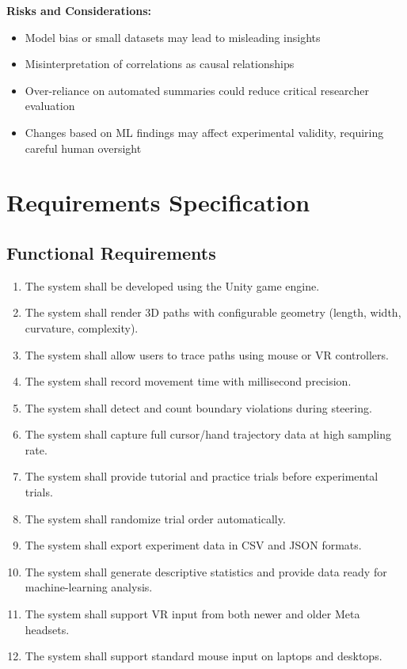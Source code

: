 \documentclass[sigconf]{acmart}
\begin{document}
\textbf{Risks and Considerations:}
\begin{itemize}
  \item Model bias or small datasets may lead to misleading insights
  \item Misinterpretation of correlations as causal relationships
  \item Over-reliance on automated summaries could reduce critical
        researcher evaluation
  \item Changes based on ML findings may affect experimental validity,
        requiring careful human oversight
\end{itemize}





\section{Requirements Specification}

\subsection{Functional Requirements}
\begin{enumerate}[label=FR\arabic*:]
  \item The system shall be developed using the Unity game engine.
  \item The system shall render 3D paths with configurable geometry
        (length, width, curvature, complexity).
  \item The system shall allow users to trace paths using mouse or VR controllers.
  \item The system shall record movement time with millisecond precision.
  \item The system shall detect and count boundary violations during steering.
  \item The system shall capture full cursor/hand trajectory data at high sampling rate.
  \item The system shall provide tutorial and practice trials before experimental trials.
  \item The system shall randomize trial order automatically.
  \item The system shall export experiment data in CSV and JSON formats.
  \item The system shall generate descriptive statistics and provide data
        ready for machine-learning analysis.
  \item The system shall support VR input from both newer and older Meta headsets.
  \item The system shall support standard mouse input on laptops and desktops.
\end{enumerate}
\end{document}
